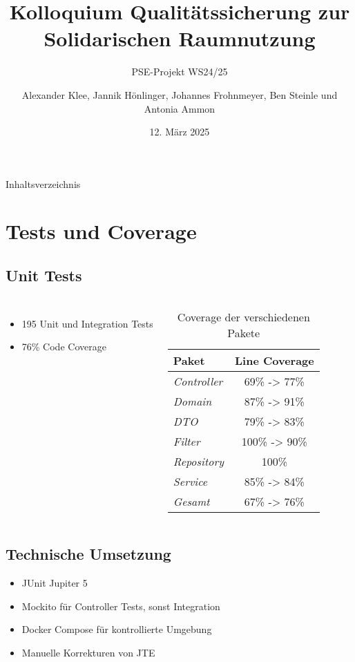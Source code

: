 \documentclass{sdqbeamer}
\title[Solidarische Raumnutzung Qualitätssicherung]{Kolloquium Qualitätssicherung zur Solidarischen Raumnutzung}
\subtitle{PSE-Projekt WS24/25}
\author[]{Alexander Klee, Jannik Hönlinger, Johannes Frohnmeyer, Ben Steinle und Antonia Ammon}
\date[12.\,3.\,2025]{12. März 2025}
\begin{document}
\KITtitleframe

\begin{frame}{Inhaltsverzeichnis}
\tableofcontents
\end{frame}

\section{Tests und Coverage}

\subsection{Unit Tests}
\begin{frame}{\insertsubsectionhead}
    \begin{columns}
         \begin{itemize}
            \item 195 Unit und Integration Tests
            \item 76\% Code Coverage
        \end{itemize}
         \begin{table}[h]
            \centering
            \renewcommand{\arraystretch}{1.3}
            \begin{tabular}{l|c}
                \textbf{Paket} & \textbf{Line Coverage} \\
                \hline
                \hline
                \textit{Controller}  & 69\% -> 77\% \\
                \textit{Domain}      & 87\% -> 91\%\\
                \textit{DTO}         & 79\% -> 83\%\\
                \textit{Filter}      & 100\% -> 90\% \\
                \textit{Repository}  & 100\% \\
                \textit{Service}     & 85\% -> 84\% \\
                \hline
                \textit{Gesamt}      & 67\% -> 76\% \\
            \end{tabular}
            \caption{Coverage der verschiedenen Pakete}
            \label{tab:progress}
        \end{table}
    \end{columns}
\end{frame}

\subsection{Technische Umsetzung}
\begin{frame}{\insertsubsectionhead}
    \begin{itemize}
        \item JUnit Jupiter 5
        \item Mockito für Controller Tests, sonst Integration
        \item Docker Compose für kontrollierte Umgebung
        \item Manuelle Korrekturen von JTE
    \end{itemize}
\end{frame}
\end{document}
